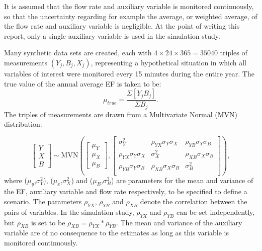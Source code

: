 It is assumed that the flow rate and auxiliary variable is monitored continuously, so that the uncertainty regarding for example the average, or weighted average, of the flow rate and auxiliary variable is negligible. At the point of writing this report, only a single auxiliary variable is used in the simulation study. 

Many synthetic data sets are created, each with $4\times24\times365=35040$ triples of measurements $(Y_j,B_j,X_j)$, representing a hypothetical situation in which all variables of interest were monitored every 15 minutes during the entire year. 
The true value of the annual average EF is taken to be:
\begin{equation*}
\mu_{true} = \frac{\Sigma[Y_jB_j]}{\Sigma B_j}.
\end{equation*}
The triples of measurements are drawn from a Multivariate Normal (MVN) distribution:

\begin{equation}\label{DrawMVN}
\begin{bmatrix}
Y \\
X \\
B
\end{bmatrix} \sim
\text{MVN} \left( 
\begin{bmatrix}
\mu_Y \\
\mu_X \\
\mu_B
\end{bmatrix},
\begin{bmatrix}
\sigma_{Y}^2 & \rho_{YX}\sigma_{Y}\sigma_{X} & \rho_{YB}\sigma_{Y}\sigma_{B} \\
\rho_{YX}\sigma_{Y}\sigma_{X} & \sigma_{X}^2 & \rho_{XB}\sigma_{X}\sigma_{B} \\
\rho_{YB}\sigma_{Y}\sigma_{B} & \rho_{XB}\sigma_{X}\sigma_{B} & \sigma_{B}^2 \\
\end{bmatrix}
\right),
\end{equation}
where ($\mu_y$,$\sigma_{Y}^2$), ($\mu_x$,$\sigma_{X}^2$) and ($\mu_B$,$\sigma_{B}^2$) are parameters for the mean and variance of the EF, auxiliary variable and flow rate respectively, to be specified to define a scenario. The parameters $\rho_{YX}$, $\rho_{YB}$ and $\rho_{XB}$ denote the correlation between the pairs of variables. In the simulation study,  $\rho_{YX}$ and $\rho_{YB}$ can be set independently, but $\rho_{XB}$ is set to be $\rho_{XB}=\rho_{YX}*\rho_{YB}$. The mean and variance of the auxiliary variable are of no consequence to the estimates as long as this variable is monitored continuously.

